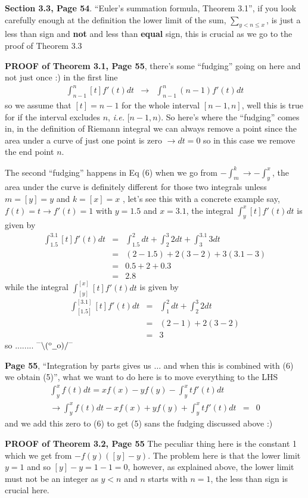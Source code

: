 \documentclass[aps,preprint,preprintnumbers,nofootinbib,showpacs,prd]{revtex4-1}
\newcommand{\ie}{{\it i.e.} }
\newcommand{\nbea}{\begin{eqnarray*}}
\newcommand{\neea}{\end{eqnarray*}}
\newcommand{\dunno}{$ {}^{\mbox {--}}\backslash(^{\rm o}{}\underline{\hspace{0.2cm}}{\rm o})/^{\mbox {--}}$}
\begin{document}
{\bf Section 3.3, Page 54}. ``Euler's summation formula, Theorem 3.1'', if you look carefully enough at the definition the lower limit of the sum, $\sum_{y<n\le x}$, is just a less than sign and {\bf not} and less than {\bf equal} sign, this is crucial as we go to the proof of Theorem 3.3

{\bf PROOF of Theorem 3.1, Page 55}, there's some ``fudging'' going on here and not just once :) in the first line
%
\nbea
\int_{n-1}^{n}[t] f'(t)dt & \to & \int_{n-1}^n (n-1)f'(t)dt
\neea
%
so we assume that $[t] = n-1$ for the whole interval $[n-1,n]$, well this is true for if the interval excludes $n$, \ie $[n-1,n)$. So here's where the ``fudging'' comes in, in the definition of Riemann integral we can always remove a point since the area under a curve of just one point is zero $\to dt = 0$ so in this case we remove the end point $n$.

The second ``fudging'' happens in Eq (6) when we go from $-\int_m^k \to -\int_y^x$, the area under the curve is definitely different for those two integrals unless $m=[y]=y$ and $k=[x]=x$ , let's see this with a concrete example say, $f(t) = t \to f'(t) = 1$ with $y = 1.5$ and $x = 3.1$, the integral $\int_y^x[t]f'(t)dt$ is given by
%
\nbea
\int_{1.5}^{3.1}[t]f'(t)dt & = & \int_{1.5}^{2}dt + \int_{2}^{3}2dt+  \int_{3}^{3.1}3dt \\
& = & (2-1.5) + 2(3-2) + 3(3.1-3) \\
& = & 0.5 + 2 + 0.3 \\
& = & 2.8
\neea
%
while the integral $\int_{[y]}^{[x]}[t]f'(t)dt$ is given by
%
\nbea
\int_{[1.5]}^{[3.1]}[t]f'(t)dt & = & \int_{1}^{2}dt + \int_{2}^{3}2dt \\
& = & (2-1) + 2(3-2) \\
& = & 3
\neea
%
so ........ \dunno

{\bf Page 55}, ``Integration by parts gives us $\dots$ and when this is combined with (6) we obtain (5)'', what we want to do here is to move everything to the LHS
%
\nbea
\int_y^x f(t)dt = xf(x) - yf(y) - \int_y^xtf'(t)dt \\
\to \int_y^x f(t)dt - xf(x) + yf(y) + \int_y^xtf'(t)dt & = & 0
\neea
%
and we add this zero to (6) to get (5) sans the fudging discussed above :)

{\bf PROOF of Theorem 3.2, Page 55} The peculiar thing here is the constant 1 which we get from $-f(y)([y]-y)$. The problem here is that the lower limit $y = 1$ and so $[y]-y = 1-1=0$, however, as explained above, the lower limit must not be an integer as $y < n$ and $n$ starts with $n=1$, the less than sign is crucial here.
\end{document}
